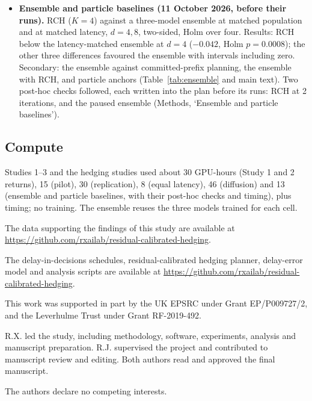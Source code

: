 \documentclass[pdflatex,sn-nature]{sn-jnl}%
\begin{document}
\begin{itemize}
\begin{itemize}
\item C4: full variant (learned model with hand-off penalty) vs committed prefix. Result: not supported ($-0.001$, $+0.026$).
\end{itemize}
Secondary: both hedges beat committed-prefix planning ($+0.025$/$+0.037$ for the bank, $+0.025$/$+0.047$ for the learned model, at $d=4$/$8$).
\item \textbf{Ensemble and particle baselines (11 October 2026, before their runs).} RCH ($K=4$) against a three-model ensemble at matched population and at matched latency, $d=4,8$, two-sided, Holm over four. Results: RCH below the latency-matched ensemble at $d=4$ ($-0.042$, Holm $p=0.0008$); the other three differences favoured the ensemble with intervals including zero. Secondary: the ensemble against committed-prefix planning, the ensemble with RCH, and particle anchors (Table~\ref{tab:ensemble} and main text). Two post-hoc checks followed, each written into the plan before its runs: RCH at 2 iterations, and the paused ensemble (Methods, `Ensemble and particle baselines').
\end{itemize}

\subsection{Compute}\label{app:compute}

Studies 1--3 and the hedging studies used about 30 GPU-hours (Study 1 and 2 returns), 15 (pilot), 30 (replication), 8 (equal latency), 46 (diffusion) and 13 (ensemble and particle baselines, with their post-hoc checks and timing), plus timing; no training. The ensemble reuses the three models trained for each cell.

\backmatter


The data supporting the findings of this study are available at \url{https://github.com/rxailab/residual-calibrated-hedging}.


The delay-in-decisions schedules, residual-calibrated hedging planner, delay-error model and analysis scripts are available at \url{https://github.com/rxailab/residual-calibrated-hedging}.




This work was supported in part by the UK EPSRC under Grant EP/P009727/2, and the Leverhulme Trust under Grant RF-2019-492.


R.X. led the study, including methodology, software, experiments, analysis and manuscript preparation. R.J. supervised the project and contributed to manuscript review and editing. Both authors read and approved the final manuscript.


The authors declare no competing interests.
\end{document}
